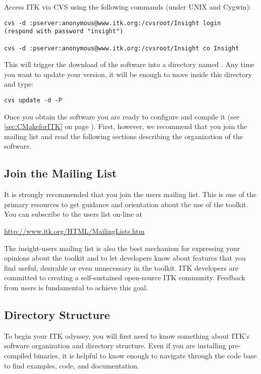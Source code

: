 Access ITK via CVS using the following commands (under UNIX and Cygwin): 
\begin{verbatim}
cvs -d :pserver:anonymous@www.itk.org:/cvsroot/Insight login
(respond with password "insight")

cvs -d :pserver:anonymous@www.itk.org:/cvsroot/Insight co Insight
\end{verbatim}

This will trigger the download of the software into a directory named
.  Any time you want to update your version, it will be enough to
move inside this directory  and type:
\begin{verbatim}
cvs update -d -P
\end{verbatim}

Once you obtain the software you are ready to configure and compile it (see
\ref{sec:CMakeforITK} on page \pageref{sec:CMakeforITK}). First,
however, we recommend that you join the mailing list and read the following
sections describing the organization of the software. 

\subsection{Join the Mailing List}
\label{sec:JoinMailList}


It is strongly recommended that you join the users mailing list. This is one
of the primary resources to get guidance and orientation about the use of the 
toolkit. You can subscribe to the users list on-line at
\begin{center}
\url{http://www.itk.org/HTML/MailingLists.htm}
\end{center} 

The insight-users mailing list is also the best mechanism for expressing your
opinions about the toolkit and to let developers know about features that
you find useful, desirable or even unnecessary in the toolkit. ITK
developers are committed to creating a self-sustained open-source
ITK community. Feedback from users is fundamental to achieve this goal.

\subsection{Directory Structure}
\label{sec:DirectoryStructure}

To begin your ITK odyssey, you will first need to know something about ITK's
software organization and directory structure. Even if you are installing
pre-compiled binaries, it is helpful to know enough to navigate through the
code base to find examples, code, and documentation.

